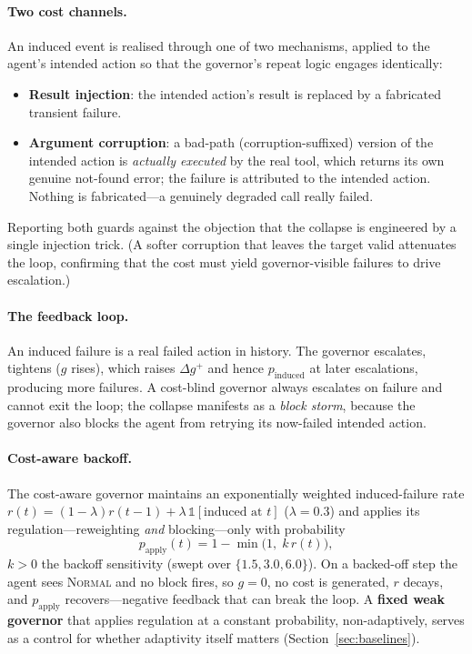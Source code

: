 \documentclass[11pt]{article}
\begin{document}
\paragraph{Two cost channels.}
An induced event is realised through one of two mechanisms, applied to the
agent's intended action so that the governor's repeat logic engages
identically:
\begin{itemize}[leftmargin=1.4em,itemsep=2pt]
\item \textbf{Result injection}: the intended action's result is replaced by a
fabricated transient failure.
\item \textbf{Argument corruption}: a bad-path (corruption-suffixed) version of
the intended action is \emph{actually executed} by the real tool, which returns
its own genuine not-found error; the failure is attributed to the intended
action. Nothing is fabricated---a genuinely degraded call really failed.
\end{itemize}
Reporting both guards against the objection that the collapse is engineered by
a single injection trick. (A softer corruption that leaves the target valid
attenuates the loop, confirming that the cost must yield governor-visible
failures to drive escalation.)

\paragraph{The feedback loop.}
An induced failure is a real failed action in history. The governor escalates,
tightens ($g$ rises), which raises $\Delta g^{+}$ and hence
$p_{\mathrm{induced}}$ at later escalations, producing more failures. A
cost-blind governor always escalates on failure and cannot exit the loop; the
collapse manifests as a \emph{block storm}, because the governor also blocks
the agent from retrying its now-failed intended action.

\paragraph{Cost-aware backoff.}
The cost-aware governor maintains an exponentially weighted induced-failure rate
$r(t)=(1-\lambda)r(t-1)+\lambda\,\mathbb{1}[\text{induced at }t]$
($\lambda=0.3$) and applies its regulation---reweighting \emph{and}
blocking---only with probability
\begin{equation}
p_{\mathrm{apply}}(t)=1-\min\!\big(1,\;k\,r(t)\big),
\label{eq:papply}
\end{equation}
$k>0$ the backoff sensitivity (swept over $\{1.5,3.0,6.0\}$). On a backed-off
step the agent sees \textsc{Normal} and no block fires, so $g=0$, no cost is
generated, $r$ decays, and $p_{\mathrm{apply}}$ recovers---negative feedback
that can break the loop. A \textbf{fixed weak governor} that applies regulation
at a constant probability, non-adaptively, serves as a control for whether
adaptivity itself matters (Section~\ref{sec:baselines}).
\end{document}
